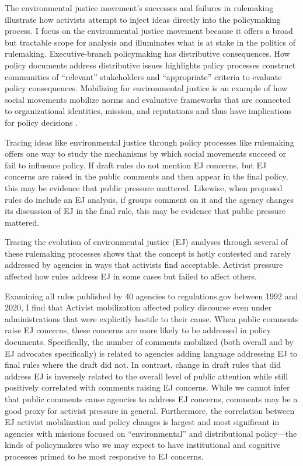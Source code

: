 \documentclass[
      12pt,
        ]{article}
\begin{document}
The environmental justice movement's successes and failures in rulemaking illustrate how activists attempt to
inject ideas directly into the policymaking process. I focus on the
environmental justice movement because it offers a broad but tractable
scope for analysis and illuminates what is at stake in the politics of
rulemaking. Executive-branch policymaking has distributive consequences. How policy documents address distributive issues highlights policy processes construct communities of ``relevant'' stakeholders and ``appropriate'' criteria to evaluate policy consequences.
Mobilizing for environmental justice is an example of how social
movements mobilize norms and evaluative frameworks that are
connected to organizational identities, mission, and reputations and
thus have implications for policy decisions \citep{Carpenter2001}.

Tracing ideas like environmental justice through policy processes like rulemaking offers one way to study the mechanisms by which social movements succeed or fail to influence policy. If draft rules
do not mention EJ concerns, but
EJ concerns are raised in the public comments and
then appear in the final policy, this may be evidence that public pressure mattered. Likewise, when proposed rules do include an EJ analysis, if groups comment on it and the agency changes its discussion of EJ in the final rule, this may be evidence that public pressure mattered.

Tracing the evolution of environmental justice (EJ) analyses through several of these rulemaking processes shows that the concept is hotly contested and rarely addressed by agencies in ways that activists find acceptable. Activist pressure affected how rules address EJ in some cases but failed to affect others.

Examining all rules published by 40 agencies to regulations.gov between 1992 and 2020, I find that Activist mobilization affected policy discourse even under administrations that were explicitly hostile to their cause. When public comments raise
EJ concerns, these concerns are more likely to be
addressed in policy documents. Specifically, the number of comments mobilized (both overall and by EJ advocates specifically) is related to agencies adding language addressing EJ to final rules where the draft did not. In contrast, change in draft rules that did address EJ is inversely related to the overall level of public attention while still positively correlated with comments raising EJ concerns.
While we cannot infer that public comments cause agencies to address EJ concerns, comments may be a good proxy for activist pressure in general. Furthermore, the correlation between EJ activist mobilization and policy changes is largest and most significant in agencies with missions focused on ``environmental'' and distributional policy---the kinds of policymakers who we may expect to have
institutional and cognitive processes primed to be most responsive to
EJ concerns.
\end{document}
